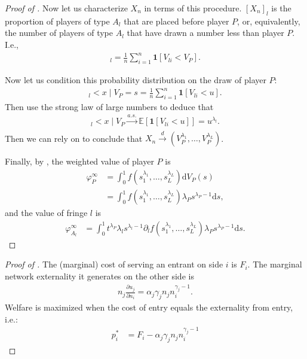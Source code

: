 \documentclass[a4paper]{article}
\newcommand{\ds}{\mathrm{d}s}
\newcommand{\E}{\mathbb{E}}
\begin{document}
\begin{proof}[Proof of ]
    Now let us characterize $X_n$ in terms of this procedure.
    $[X_n]_l$ is the proportion of players of type $A_l$ that are placed before player $P$, or, equivalently, the number of players of type $A_l$ that have drawn a number less than player $P$.
    I.e.,
    \begin{align*}
        [X_n]_l = \frac{1}{n}\sum_{i = 1}^n \mathbf{1}[V_{li} < V_P].
    \end{align*}

    Now let us condition this probability distribution on the draw of player $P$:
    \begin{align*}
        [X_n]_l < x \mid V_P = s = \frac{1}{n} \sum_{i=1}^n \mathbf{1}[V_{li} < u].
    \end{align*}
    Then use the strong law of large numbers to deduce that
    \begin{align*}
        [X_n]_l < x \mid V_P \xrightarrow[]{a.s.} \E[\mathbf{1}[V_{li} < u]] = u^{\lambda_l}.
    \end{align*}
    Then we can rely on  to conclude that $X_n \xrightarrow[]{d} (V_P^{\lambda_1}, \dots, V_P^{\lambda_L})$.

    Finally, by , the weighted value of player $P$ is
    \begin{align*}
        \varphi_P^\infty &= \int_0^1 f(s_1^{\lambda_1}, \dots, s_L^{\lambda_L}) \mathrm{d} V_P(s) \\
        &= \int_0^1 f(s_1^{\lambda_1}, \dots, s_L^{\lambda_L}) \lambda_P s^{\lambda_P - 1} \ds,
    \end{align*}
    and the value of fringe $l$ is
    \begin{align*}
        \varphi_{A_l}^\infty &= \int_0^1 t^{\lambda_P} \lambda_l s^{\lambda_l - 1} \partial_l f(s_1^{\lambda_1}, \dots, s_L^{\lambda_L}) \lambda_P s^{\lambda_P - 1} \ds.
    \end{align*}
    
\end{proof}

\begin{proof}[Proof of ]
    The (marginal) cost of serving an entrant on side $i$ is $F_i$.
    The marginal network externality it generates on the other side is
    \begin{align*}
        n_j \frac{\partial u_j}{\partial n_i} = \alpha_j \gamma_j n_j n_i^{\gamma_j - 1}.
    \end{align*}
    Welfare is maximized when the cost of entry equals the externality from entry, i.e.:
    \begin{align*}
        p_i^* &= F_i - \alpha_j \gamma_j n_j n_i^{\gamma_j - 1}
    \end{align*}
\end{proof}
\end{document}

